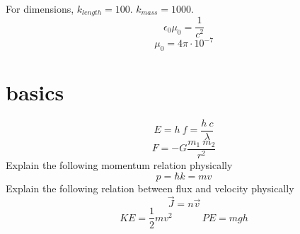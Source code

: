\documentclass[12pt]{report}
\begin{document}
For dimensions, $k_{length} = 100$. $k_{mass}=1000$.
\ \\


\begin{equation}
 \epsilon_0 \mu_0 = \frac{1}{c^2}
\end{equation}
\begin{equation}
 \mu_0 = 4 \pi \cdot 10^{-7}
\end{equation}

\section{basics}
\begin{equation}
 E = h\ f = \frac{h\ c}{\lambda}  
\end{equation}
\begin{equation}
 F = -G \frac{m_1\ m_2}{r^2}
\end{equation}
Explain the following momentum relation physically
\begin{equation}
 p = \hbar k =mv
\end{equation}
Explain the following relation between flux and velocity physically
\begin{equation}
 \vec{J} = n \vec{v}
\end{equation}
\begin{equation}
 KE = \frac{1}{2} m v^2 \quad \quad \quad PE = mgh
\end{equation}
\end{document}
